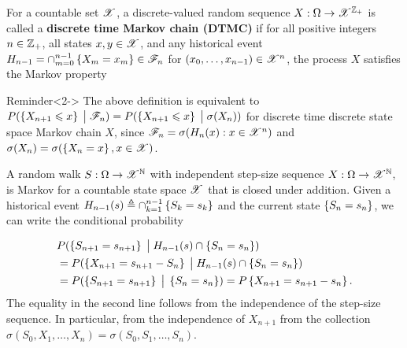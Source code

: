 \documentclass[12pt,aspectratio=169]{beamer}
\begin{document}
\begin{frame}
\begin{Definition}[DTMC]
For a countable set $\mathscr{X}$, a discrete-valued random sequence $X: \Omega \to \mathscr{X}^{\mathbb{Z}_+}$ is called a \textbf{discrete time Markov chain (DTMC)} 
if for all positive integers $n \in \mathbb{Z}_+$, all states $x,y \in \mathscr{X}$, 
and any historical event $H_{n-1} = \cap_{m=0}^{n-1}\left\{X_m = x_m\right\} \in \mathscr{F}_n$ for $(x_0, \dots, x_{n-1}) \in \mathscr{X}^{n}$, 
the process $X$ satisfies the Markov property 
\end{Definition}
\begin{block}{Reminder}<2->
The above definition is equivalent to $P(\left\{X_{n+1} \leqslant x\right\}\; \big\vert \; \mathscr{F}_n) = P(\left\{X_{n+1} \leqslant x\right\}\; \big\vert \; \sigma(X_n))$ for discrete time discrete state space Markov chain $X$,   
since $\mathscr{F}_n = \sigma(H_n(x): x \in \mathscr{X}^n)$ and $\sigma(X_n) = \sigma(\left\{X_n = x\right\}, x \in \mathscr{X})$. 
\end{block}
\end{frame}


\begin{frame}
\begin{Example} 
A random walk $S:\Omega\to\mathscr{X}^{\mathbb{N}}$ with independent step-size sequence $X:\Omega\to\mathscr{X}^{\mathbb{N}}$, 
is Markov for a countable state space $\mathscr{X}$ that is closed under addition. 
Given a historical event $H_{n-1}(s) \triangleq \cap_{k=1}^{n-1}\left\{S_k = s_k\right\}$ and the current state $\left\{S_n = s_n\right\}$, 
we can write the conditional probability 
\end{Example}
\end{frame}


\begin{frame}
\begin{Example}
\begin{align*}
&P(\left\{S_{n+1} = s_{n+1}\right\}\; \big\vert \; H_{n-1}(s)\cap\left\{S_n = s_n\right\}) \\
&= P(\left\{X_{n+1} = s_{n+1}-S_n\right\}\; \big\vert \; H_{n-1}(s)\cap\left\{S_n = s_n\right\})\\
&= P(\left\{S_{n+1} = s_{n+1}\right\}\; \big\vert \; \left\{S_n = s_n\right\}) 
= P\left\{X_{n+1} 
= s_{n+1}-s_n\right\} .
\end{align*}
The equality in the second line follows from the independence of the step-size sequence. 
In particular, from the independence of $X_{n+1}$ from the collection $\sigma(S_0, X_1, \dots, X_n) = \sigma(S_0, S_1, \dots, S_n)$. 
\end{Example}
\end{frame}
\end{document}
